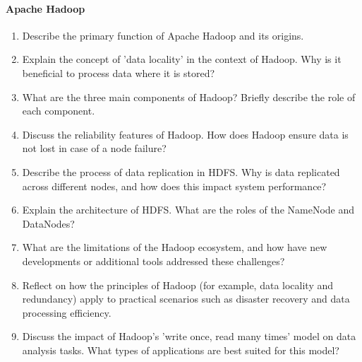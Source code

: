 \paragraph*{Apache Hadoop}
\begin{enumerate}
	\item Describe the primary function of Apache Hadoop and its origins.
	\item Explain the concept of 'data locality' in the context of Hadoop. Why is it beneficial to process data where it is stored?
	\item What are the three main components of Hadoop? Briefly describe the role of each component.
	\item Discuss the reliability features of Hadoop. How does Hadoop ensure data is not lost in case of a node failure?
	\item Describe the process of data replication in HDFS. Why is data replicated across different nodes, and how does this impact system performance?
	\item Explain the architecture of HDFS. What are the roles of the NameNode and DataNodes?
	\item What are the limitations of the Hadoop ecosystem, and how have new developments or additional tools addressed these challenges?
	\item Reflect on how the principles of Hadoop (for example, data locality and redundancy) apply to practical scenarios such as disaster recovery and data processing efficiency.
	\item Discuss the impact of Hadoop's 'write once, read many times' model on data analysis tasks. What types of applications are best suited for this model?
\end{enumerate}
